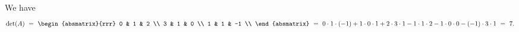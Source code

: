 \begin{solution}
  We have
  \begin{equation*}
    \det(A) ~=~
    \begin{absmatrix}{rrr}
      0 & 1 & 2 \\
      3 & 1 & 0 \\
      1 & 1 & -1 \\
    \end{absmatrix}
    ~=~
    0\cdot 1\cdot (-1)
    + 1\cdot 0 \cdot 1
    + 2 \cdot 3 \cdot 1
    - 1\cdot 1\cdot 2
    - 1\cdot 0\cdot 0
    - (-1)\cdot 3\cdot 1
    ~=~ 7.
  \end{equation*}
\end{solution}
